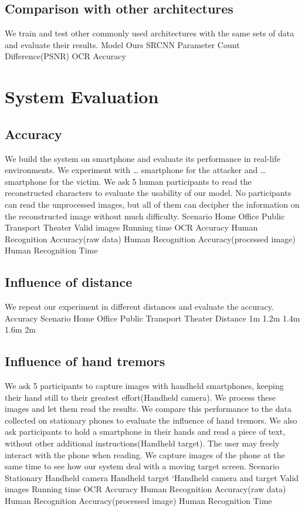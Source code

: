 \subsection{Comparison with other architectures}
We train and test other commonly used architectures with the same sets of data and evaluate their results.
Model	Ours	SRCNN						
Parameter Count								
Difference(PSNR)								
OCR Accuracy								

\section{System Evaluation}
\subsection{Accuracy}
We build the system on smartphone and evaluate its performance in real-life environments. We experiment with … smartphone for the attacker and … smartphone for the victim. We ask 5 human participants to read the reconstructed characters to evaluate the usability of our model. No participants can read the unprocessed images, but all of them can decipher the information on the reconstructed image without much difficulty.
Scenario	Home	Office	Public Transport	Theater
Valid images				
Running time				
OCR Accuracy				
Human Recognition Accuracy(raw data)				
Human Recognition Accuracy(processed image)				
Human Recognition Time				
\subsection{Influence of distance}
We repeat our experiment in different distances and evaluate the accuracy.
Accuracy	Scenario	Home	Office	Public Transport	Theater
Distance					
1m					
1.2m					
1.4m					
1.6m					
2m					
\subsection{Influence of hand tremors}
We ask 5 participants to capture images with handheld smartphones, keeping their hand still to their greatest effort(Handheld camera). We process these images and let them read the results. We compare this performance to the data collected on stationary phones to evaluate the influence of hand tremors.
We also ask participants to hold a smartphone in their hands and read a piece of text, without other additional instructions(Handheld target). The user may freely interact with the phone when reading. We capture images of the phone at the same time to see how our system deal with a moving target screen.
Scenario	Stationary	Handheld camera	Handheld target	‘Handheld camera and target
Valid images				
Running time				
OCR Accuracy				
Human Recognition Accuracy(raw data)				
Human Recognition Accuracy(processed image)				
Human Recognition Time				
